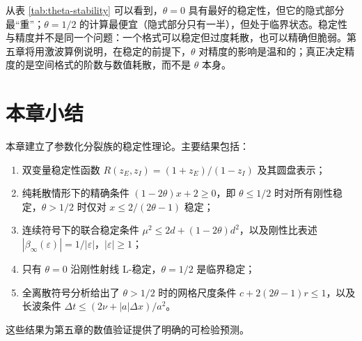 从表 \ref{tab:theta-stability} 可以看到，$\theta=0$ 具有最好的稳定性，但它的隐式部分最“重”；$\theta=1/2$ 的计算最便宜（隐式部分只有一半），但处于临界状态。稳定性与精度并不是同一个问题：一个格式可以稳定但过度耗散，也可以精确但脆弱。第五章将用激波算例说明，在稳定的前提下，$\theta$ 对精度的影响是温和的；真正决定精度的是空间格式的阶数与数值耗散，而不是 $\theta$ 本身。

\section{本章小结}

本章建立了参数化分裂族的稳定性理论。主要结果包括：
\begin{enumerate}[label=(\arabic*),leftmargin=2.4em]
  \item 双变量稳定性函数 $R(z_E,z_I)=(1+z_E)/(1-z_I)$ 及其圆盘表示；
  \item 纯耗散情形下的精确条件 $(1-2\theta)x+2\ge0$，即 $\theta\le1/2$ 时对所有刚性稳定，$\theta>1/2$ 时仅对 $x\le2/(2\theta-1)$ 稳定；
  \item 连续符号下的联合稳定条件 $\mu^2\le2d+(1-2\theta)d^2$，以及刚性比表述 $|\beta_\infty(\varepsilon)|=1/|\varepsilon|$，$|\varepsilon|\ge1$；
  \item 只有 $\theta=0$ 沿刚性射线 L-稳定，$\theta=1/2$ 是临界稳定；
  \item 全离散符号分析给出了 $\theta>1/2$ 时的网格尺度条件 $c+2(2\theta-1)r\le1$，以及长波条件 $\Delta t\le(2\nu+|a|\Delta x)/a^2$。
\end{enumerate}
这些结果为第五章的数值验证提供了明确的可检验预测。
